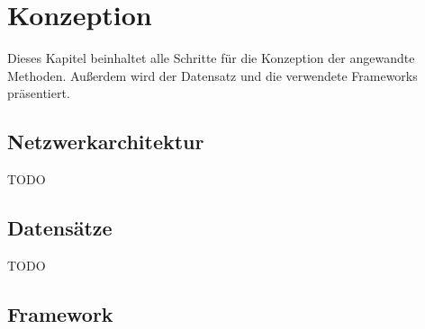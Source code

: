 \chapter{Konzeption}
Dieses Kapitel beinhaltet alle Schritte für die Konzeption der angewandte Methoden. Außerdem wird der Datensatz und die verwendete Frameworks 
präsentiert.


\section{Netzwerkarchitektur}
TODO
\section{Datensätze}
TODO
\section{Framework}
